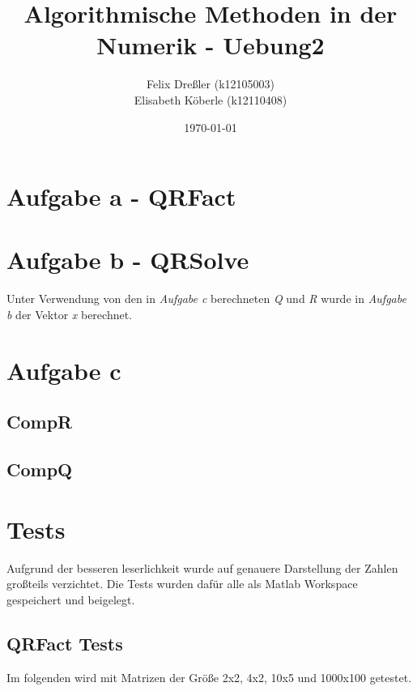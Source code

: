 \documentclass[11pt,titlepage]{article}
\title{Algorithmische Methoden in der Numerik - Uebung2}
\author{Felix Dreßler (k12105003) \\ Elisabeth Köberle (k12110408)}
\date{\today} %
\begin{document}
\maketitle

	\section{Aufgabe a - QRFact}
	
		
			
\newpage			
	\section{Aufgabe b - QRSolve}
	
	Unter Verwendung von den in \emph{Aufgabe c} berechneten \emph{Q} und \emph{R} wurde in \emph{Aufgabe b} der Vektor \emph{x} berechnet.
	
		
		
\newpage
	\section{Aufgabe c}
		\subsection{CompR}
		
			
			
		\subsection{CompQ}
		
			
			
\newpage
	\section{Tests}
		Aufgrund der besseren leserlichkeit wurde auf genauere Darstellung der Zahlen großteils verzichtet. Die Tests wurden dafür alle als Matlab Workspace gespeichert und beigelegt.
	
		\subsection{QRFact Tests}
		Im folgenden wird mit Matrizen der Größe 2x2, 4x2, 10x5 und 1000x100 getestet. 
\end{document}
